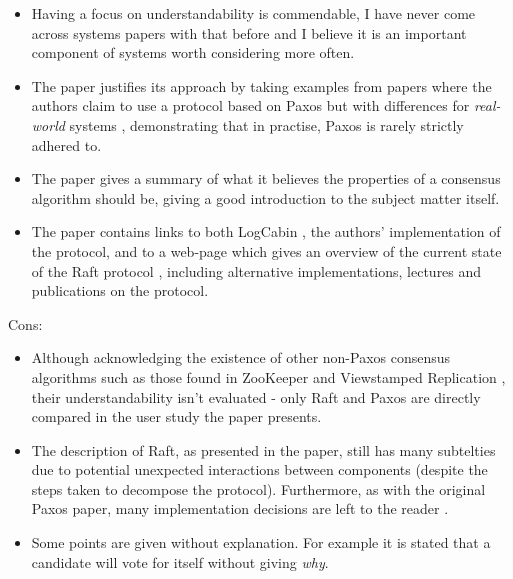 \documentclass[11pt]{article}
\begin{document}
\begin{itemize}

    \item Having a focus on understandability is commendable, I have never come
    across systems papers with that before and I believe it is an important
    component of systems worth considering more often.

    \item The paper justifies its approach by taking examples from papers where
    the authors claim to use a protocol based on Paxos but with differences for
    \textit{real-world} systems \cite{Chubby}, demonstrating that in practise,
    Paxos is rarely strictly adhered to.

    \item The paper gives a summary of what it believes the properties of a
    consensus algorithm should be, giving a good introduction to the subject
    matter itself.

    \item The paper contains links to both LogCabin \cite{LogCabin}, the
    authors' implementation of the protocol, and to a web-page which gives an
    overview of the current state of the Raft protocol \cite{RaftIO}, including
    alternative implementations, lectures and publications on the protocol.

\end{itemize}

Cons:

\begin{itemize}

    \item Although acknowledging the existence of other non-Paxos consensus
    algorithms such as those found in ZooKeeper \cite{ZooKeeper} and
    Viewstamped Replication \cite{ViewstampedReplication}, their
    understandability isn't evaluated - only Raft and Paxos are directly
    compared in the user study the paper presents.

    \item The description of Raft, as presented in the paper, still has many
    subtelties due to potential unexpected interactions between components
    (despite the steps taken to decompose the protocol). Furthermore, as with
    the original Paxos paper, many implementation decisions are left to the
    reader \cite{RaftRefloated}.

    \item Some points are given without explanation. For example it is stated
    that a candidate will vote for itself without giving \textit{why}.

\end{itemize}
\end{document}
